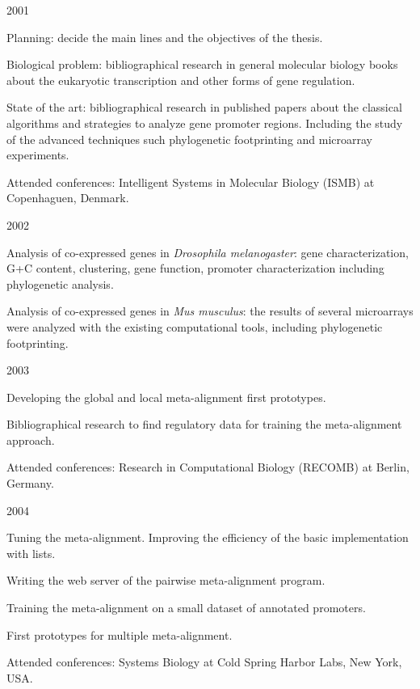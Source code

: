 \begin{mitemize}
\item 2001
\begin{menumerate}
\item Planning: decide the main lines and the objectives of the thesis.
\item Biological problem: bibliographical research in general molecular biology books about the 
eukaryotic transcription and other forms of gene regulation.
\item State of the art: bibliographical research in published papers about the classical algorithms
and strategies to analyze gene promoter regions. Including the study of the advanced techniques such
phylogenetic footprinting and microarray experiments.
\item Attended conferences: Intelligent Systems in Molecular Biology (ISMB) at Copenhaguen, Denmark.
\end{menumerate}

\item 2002
\begin{menumerate}
\item Analysis of co-expressed genes in \emph{Drosophila melanogaster}: gene characterization, 
G+C content, clustering, gene function, promoter characterization including phylogenetic analysis.
\item Analysis of co-expressed genes in \emph{Mus musculus}: the results of several microarrays were 
analyzed with the existing computational tools, including phylogenetic footprinting.
\end{menumerate}

\item 2003
\begin{menumerate}
\item
Developing the global and local meta-alignment first prototypes.
\item
Bibliographical research to find regulatory data for training the meta-alignment approach.
\item
Attended conferences: Research in Computational Biology (RECOMB) at Berlin, Germany.
\end{menumerate}


\item 2004
\begin{menumerate}
\item
Tuning the meta-alignment. Improving the efficiency of the basic implementation with lists.
\item
Writing the web server of the pairwise meta-alignment program.
\item 
Training the meta-alignment on a small dataset of annotated promoters.
\item
First prototypes for multiple meta-alignment.
\item
Attended conferences: Systems Biology at Cold Spring Harbor Labs, New York, USA.
\end{menumerate}



\end{mitemize}
